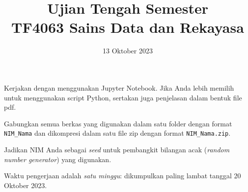 \documentclass[a4paper,11pt]{article} %
\begin{document}
\title{Ujian Tengah Semester \\
TF4063 Sains Data dan Rekayasa}
\author{}
\date{13 Oktober 2023}
\maketitle


Kerjakan dengan menggunakan Jupyter Notebook. Jika Anda lebih memilih untuk menggunakan
script Python, sertakan juga penjelasan dalam bentuk file pdf.

Gabungkan semua berkas yang digunakan dalam satu folder dengan format
\texttt{NIM\_Nama} dan dikompresi dalam satu file zip dengan format
\texttt{NIM\_Nama.zip}.

Jadikan NIM Anda sebagai \textit{seed} untuk pembangkit bilangan acak
(\textit{random number generator}) yang digunakan.

Waktu pengerjaan adalah \emph{satu minggu}: dikumpulkan paling lambat
tanggal 20 Oktober 2023.
\end{document}
